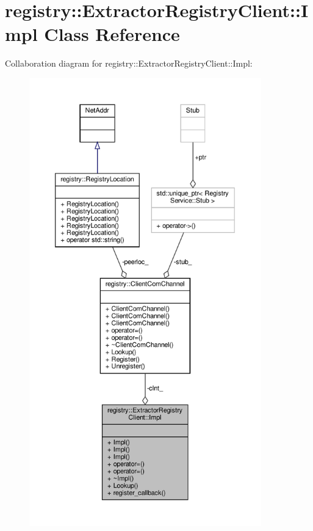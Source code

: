 \hypertarget{classregistry_1_1ExtractorRegistryClient_1_1Impl}{}\section{registry\+:\+:Extractor\+Registry\+Client\+:\+:Impl Class Reference}
\label{classregistry_1_1ExtractorRegistryClient_1_1Impl}


Collaboration diagram for registry\+:\+:Extractor\+Registry\+Client\+:\+:Impl\+:\nopagebreak
\begin{figure}[H]
\begin{center}
\leavevmode
\includegraphics[height=550pt]{classregistry_1_1ExtractorRegistryClient_1_1Impl__coll__graph}
\end{center}
\end{figure}
